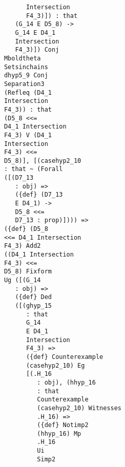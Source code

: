 \documentclass[12pt]{article}
\begin{document}
\begin{verbatim}
                                     Intersection 
                                     F4_3)]) : that 
                                  (G_14 E D5_8) -> 
                                  G_14 E D4_1 
                                  Intersection 
                                  F4_3)]) Conj 
                               Mboldtheta 
                               Setsinchains 
                               dhyp5_9 Conj 
                               Separation3 
                               (Refleq (D4_1 
                               Intersection 
                               F4_3)) : that 
                               (D5_8 <<= 
                               D4_1 Intersection 
                               F4_3) V (D4_1 
                               Intersection 
                               F4_3) <<= 
                               D5_8)], [(casehyp2_10 
                               : that ~ (Forall 
                               ([(D7_13 
                                  : obj) => 
                                  ({def} (D7_13 
                                  E D4_1) -> 
                                  D5_8 <<= 
                                  D7_13 : prop)]))) => 
                               ({def} (D5_8 
                               <<= D4_1 Intersection 
                               F4_3) Add2 
                               ((D4_1 Intersection 
                               F4_3) <<= 
                               D5_8) Fixform 
                               Ug ([(G_14 
                                  : obj) => 
                                  ({def} Ded 
                                  ([(ghyp_15 
                                     : that 
                                     G_14 
                                     E D4_1 
                                     Intersection 
                                     F4_3) => 
                                     ({def} Counterexample 
                                     (casehyp2_10) Eg 
                                     [(.H_16 
                                        : obj), (hhyp_16 
                                        : that 
                                        Counterexample 
                                        (casehyp2_10) Witnesses 
                                        .H_16) => 
                                        ({def} Notimp2 
                                        (hhyp_16) Mp 
                                        .H_16 
                                        Ui 
                                        Simp2 

\end{verbatim}
\end{document}

